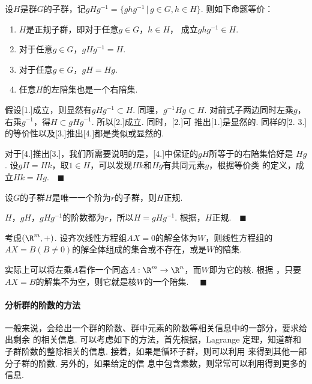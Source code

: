   \begin{thm}
    \label{thm: 正规子群等价命题}
    设$H$是群$G$的子群，记$gHg^{-1}=\{ghg^{-1}\,|\,g\in G,h\in H\}$.
    则如下命题等价：
    \begin{enumerate}
      \item $H$是正规子群，即对于任意$g\in G$，$h\in H$，
        成立$ghg^{-1}\in H$.
      \item 对于任意$g\in G$，$gHg^{-1} = H$.
      \item 对于任意$g\in G$，$gH = Hg$.
      \item 任意$H$的左陪集也是一个右陪集.
    \end{enumerate}
  \end{thm}
  \proof
    假设[1.]成立，则显然有$gHg^{-1}\subset H$. 同理，$g^{-1}Hg\subset H$.
    对前式子两边同时左乘$g$，右乘$g^{-1}$，得\footnotemark$H\subset gHg^{-1}$.
     所以[2.]成立. 同时，[2.]可
    推出[1.]是显然的. 同样的[2. 3.]的等价性以及[3.]推出[4.]都是类似或显然的.\par
    对于[4.]推出[3.]，我们所需要说明的是，[4.]中保证的$gH$所等于的右陪集恰好是
    $Hg$. 设$gH = Hk$，取$1\in H$，可以发现$Hk$和$Hg$有共同元素$g$，根据等价类
    的定义，成立$Hk = Hg$.$\quad\blacksquare$

  \begin{pos}
    设$G$的子群$H$是唯一一个阶为$r$的子群，则$H$正规.
  \end{pos}
  \proof
    $H$，$gH$，$gHg^{-1}$的阶数都为$r$，所以$H=gHg^{-1}$.
    根据，$H$正规.$\quad\blacksquare$

  \begin{thm}[线性方程组]
    考虑$(\R^m, +)$. 设齐次线性方程组$AX=0$的解全体为$W$，则线性方程组的$AX=B
    (B\ne 0)$的解全体组成的集合或不存在，或是$W$的陪集.
  \end{thm}
  \proof
    实际上可以将左乘$A$看作一个同态$A:\R^m\to\R^n$，而$W$即为它的核. 根据
    ，只要$AX=B$的解集不为空，则它就是核$W$的一个陪集.
    $\quad\blacksquare$

  \paragraph{分析群的阶数的方法}
    一般来说，会给出一个群的阶数、群中元素的阶数等相关信息中的一部分，要求给出剩余
    的相关信息. 可以考虑如下的方法，首先根据，Lagrange
    定理，知道群和子群阶数的整除相关的信息. 接着，如果是循环子群，则可以利用
    来得到其他一部分子群的阶数. 另外的，如果给定的信
    息中包含素数，则常常可以利用得到更多的信息.

